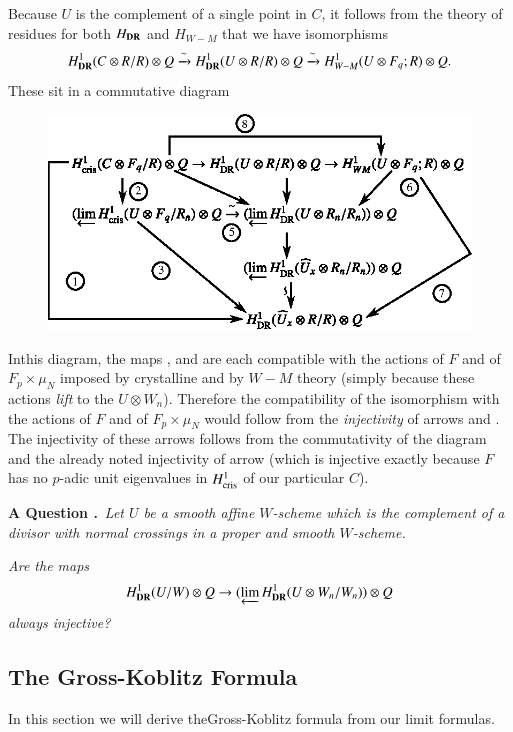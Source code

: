 Because $U$ is the complement of a single point in $C$, it follows from the theory of residues for both $H_{\mathbf{DR}}$ and $H_{W-M}$ that we have isomorphisms
$$
H^{1}_{\mathbf{DR}}(C\otimes R/R)\otimes Q\xrightarrow{\sim}H^{1}_{\mathbf{DR}}(U\otimes R/R)\otimes Q\xrightarrow{\sim}H^{1}_{W-M}(U\otimes F_{q};R)\otimes Q.
$$
These sit in a commutative diagram
\begin{figure}[H]
\centering
\includegraphics[scale=.85]{chap6/fig16.eps}
\end{figure}

In\pageoriginale this diagram, the maps ,  and  are each compatible with the actions of $F$ and of $F_{p}\times \mu_{N}$ imposed by crystalline and by $W-M$ theory (simply because these actions {\em lift} to the $U\otimes W_{n}$). Therefore the compatibility of the isomorphism  with the actions of $F$ and of $F_{p}\times \mu_{N}$ would follow from the {\em injectivity} of arrows  and . The injectivity of these arrows follows from the commutativity of the diagram and the already noted injectivity of arrow  (which is injective exactly because $F$ has no $p$-adic unit eigenvalues in $H^{1}_{\operatorname{cris}}$ of our particular $C$).

\medskip
\noindent
{\bf A Question .\label{art6-7.8.2}}~{\em Let $U$ be a smooth affine $W$-scheme which is the complement of a divisor with normal crossings in a proper and smooth $W$-scheme.}

{\em Are the maps}
$$
H^{1}_{\mathbf{DR}}(U/W)\otimes Q\to (\varprojlim H^{1}_{\mathbf{DR}}(U\otimes W_{n}/W_{n}))\otimes Q
$$
{\em always injective?}

\setcounter{section}{7}
\setcounter{subsection}{8}
\subsection{The Gross-Koblitz Formula}\label{art6-sec7.9}
In this section we will derive the\break Gross-Koblitz formula from our limit formulas.

